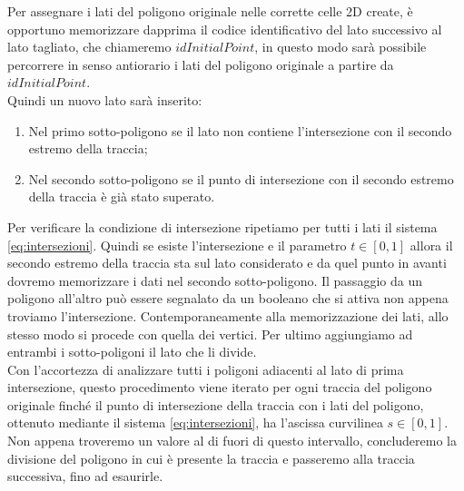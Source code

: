 \documentclass[a4paper]{article}
\begin{document}
Per assegnare i lati del poligono originale nelle corrette celle 2D create, è opportuno memorizzare dapprima il codice identificativo del lato successivo al lato tagliato, che chiameremo $idInitialPoint$,  in questo modo sarà possibile percorrere in senso antiorario i lati del poligono originale a partire da $idInitialPoint$. \\ [1.5mm]
Quindi un nuovo lato sarà inserito: 
\begin{enumerate} 
\item Nel primo sotto-poligono se il lato non contiene l'intersezione con il secondo estremo della traccia;
\item Nel secondo sotto-poligono se il punto di intersezione con il secondo estremo della traccia è già stato superato.
\end{enumerate}
Per verificare la condizione di intersezione ripetiamo per tutti i lati il sistema \eqref{eq:intersezioni}. Quindi se esiste l'intersezione e il parametro $t \in [0,1]$ allora il secondo estremo della traccia sta sul lato considerato e da quel punto in avanti dovremo memorizzare i dati nel secondo sotto-poligono. Il passaggio da un poligono all'altro può essere segnalato da un booleano che si attiva non appena troviamo l'intersezione. Contemporaneamente alla memorizzazione dei lati, allo stesso modo si procede con quella dei vertici. Per ultimo aggiungiamo ad entrambi i sotto-poligoni il lato che li divide.
\\ [2mm]
Con l'accortezza di analizzare tutti i poligoni adiacenti al lato di prima intersezione, questo procedimento viene iterato per ogni traccia del poligono originale finché il punto di intersezione della traccia con i lati del poligono, ottenuto mediante il sistema \eqref{eq:intersezioni}, ha l'ascissa curvilinea $s \in [0,1]$. Non appena troveremo un valore al di fuori di questo intervallo, concluderemo la divisione del poligono in cui è presente la traccia e passeremo alla traccia successiva, fino ad esaurirle.
\end{document}
